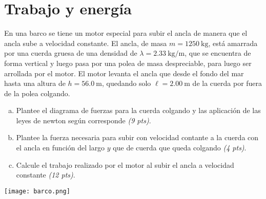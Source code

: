 \documentclass[
  12pt,
]{article}
\newcommand{\pts}[1]{ {\it (#1 pts)}}
\begin{document}
\section{Trabajo y energía}
En una barco se tiene un motor especial para subir el ancla de manera que 
el ancla sube a velocidad constante. El ancla, de masa $m = 1250\:\mathrm{kg}$, está
amarrada por una cuerda gruesa de una densidad de $\lambda = 2.33\:\mathrm{kg/m}$,
que se encuentra de forma vertical y luego pasa por una polea de masa
despreciable, para  luego ser arrollada por el motor. 
El motor levanta el ancla que desde el fondo del mar hasta una altura de 
$h = 56.0\:\mathrm{m}$, quedando solo $\ell = 2.00\:\mathrm{m}$ de la cuerda por fuera
de la polea colgando.
\begin{enumerate}[a)]
  \item Plantee el diagrama de fuerzas para la cuerda colgando y las aplicación 
    de las leyes de newton según corresponde \pts{9}.
  \item Plantee la fuerza necesaria para subir con velocidad contante a 
    la cuerda con el ancla en función del largo $y$ que de cuerda que 
    queda colgando \pts{4}.
  \item Calcule el trabajo realizado por el motor al subir el ancla a velocidad
    constante \pts{12}.
\end{enumerate}
\begin{center}
  \texttt{[image: barco.png]}
\end{center}
\end{document}
